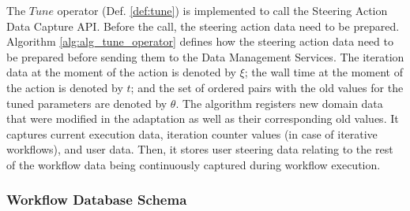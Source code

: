 The $Tune$ operator (Def. \ref{def:tune}) is implemented
to call the Steering Action Data Capture API. Before the call,
the steering action data need to be prepared.
Algorithm \ref{alg:alg_tune_operator} defines how the steering action data need to
be prepared before sending them to the Data Management Services.
The iteration data at the moment of the action is denoted by  $\xi$; the wall time at the moment of the
action is denoted by $t$; and the set of ordered pairs with
the old values for the tuned parameters are denoted by $\theta$.
The algorithm registers new domain data that
were modified in the adaptation as well as
 their corresponding old values. It captures current execution
data, iteration counter values (in case of iterative workflows), and
user data. Then, it stores user steering data relating to the rest of the workflow data
being continuously captured during workflow execution.




\subsubsection{Workflow Database Schema}


